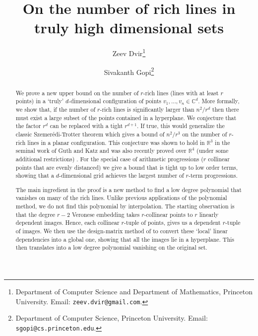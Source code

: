 \documentclass[11pt]{article}
\def\R{{\mathbb{R}}}
\def\C{{\mathbb{C}}}
\begin{document}
 
\title{On the number of rich lines in truly high dimensional sets}


\author{Zeev Dvir\thanks{Department of Computer Science and Department of Mathematics,
Princeton University.
Email: \texttt{zeev.dvir@gmail.com}. } \and
Sivakanth Gopi\thanks{Department of Computer Science, Princeton University.
Email: \texttt{sgopi@cs.princeton.edu}.}}


\date{}
\maketitle


\begin{abstract}
We prove a new upper bound on the number of $r$-rich lines (lines with at least $r$ points) in a `truly' $d$-dimensional configuration of points $v_1,\ldots,v_n \in \C^d$. More formally, we show that, if the number of $r$-rich lines is significantly larger than $n^2/r^d$ then there must exist a large subset of the points  contained in a hyperplane. We conjecture that the factor $r^d$ can be replaced with a tight $r^{d+1}$. If true,  this would generalize the classic Szemer\'edi-Trotter theorem  which gives a bound of $n^2/r^3$ on the number of $r$-rich lines in a planar configuration. This conjecture was shown to hold in $\R^3$ in the seminal work of Guth and Katz \cite{GK10} and was also recently proved  over $\R^4$ (under some additional restrictions) \cite{SS14}. For the special case of arithmetic progressions ($r$ collinear points that are evenly distanced) we give a bound that is tight up to low order terms, showing that a $d$-dimensional grid achieves the largest number of $r$-term progressions.

The main ingredient in the proof is a new method to find a low degree polynomial that vanishes on many of the rich lines. Unlike previous applications of the polynomial method, we do not find this polynomial by interpolation. The starting observation is that the degree $r-2$ Veronese embedding takes $r$-collinear points to $r$ linearly dependent images. Hence, each collinear $r$-tuple of points, gives us a dependent $r$-tuple of images. We  then use the design-matrix method of \cite{BDWY12} to convert these `local' linear dependencies into a global one, showing that all the images lie in a  hyperplane. This then translates into a low degree polynomial vanishing on the original set.
\end{abstract} 

\end{document}
